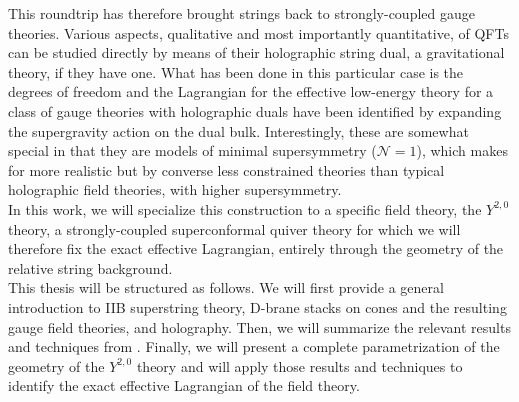 This roundtrip has therefore brought strings back to strongly-coupled gauge theories. Various aspects, qualitative and most importantly quantitative, of QFTs can be studied directly by means of their holographic string dual, a gravitational theory, if they have one. What has been done in this particular case is the degrees of freedom and the Lagrangian for the effective low-energy theory for a class of gauge theories with holographic duals have been identified by expanding the supergravity action on the dual bulk. Interestingly, these are somewhat special in that they are models of minimal supersymmetry ($\mathcal{N}=1$), which makes for more realistic but by converse less constrained theories than typical holographic field theories, with higher supersymmetry.\\

In this work, we will specialize this construction to a specific field theory, the $Y^{2,0}$ theory, a strongly-coupled superconformal quiver theory for which we will therefore fix the exact effective Lagrangian, entirely through the geometry of the relative string background.\\

This thesis will be structured as follows. We will first provide a general introduction to IIB superstring theory, D-brane stacks on cones and the resulting gauge field theories, and holography. Then, we will summarize the relevant results and techniques from \cite{MZ}. Finally, we will present a complete parametrization of the geometry of the $Y^{2,0}$ theory and will apply those results and techniques to identify the exact effective Lagrangian of the field theory.


